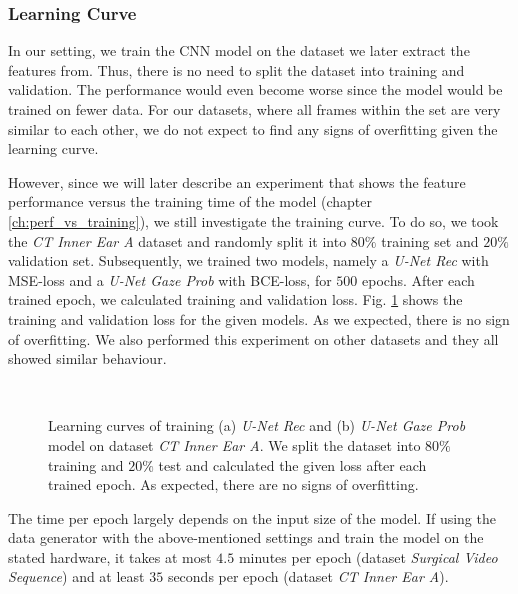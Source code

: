 \clearpage
\subsubsection{Learning Curve} \label{ch:learning_curve}
In our setting, we train the CNN model on the dataset we later extract the features from. Thus, there is no need to split the dataset into training and validation. The performance would even become worse since the model would be trained on fewer data. For our datasets, where all frames within the set are very similar to each other, we do not expect to find any signs of overfitting given the learning curve.

However, since we will later describe an experiment that shows the feature performance versus the training time of the model (chapter \ref{ch:perf_vs_training}), we still investigate the training curve. To do so, we took the \textit{CT Inner Ear A} dataset and randomly split it into $80\%$ training set and $20\%$ validation set. Subsequently, we trained two models, namely a \textit{U-Net Rec} with MSE-loss and a \textit{U-Net Gaze Prob} with BCE-loss, for $500$ epochs. After each trained epoch, we calculated training and validation loss. Fig. \ref{fig:learn_curve} shows the training and validation loss for the given models. As we expected, there is no sign of overfitting. We also performed this experiment on other datasets and they all showed similar behaviour.
\vspace{20pt}

\begin{figure}[!htbp]
  \centering
  \\
  \caption[Model learning curves]{Learning curves of training (a) \textit{U-Net Rec} and (b) \textit{U-Net Gaze Prob} model on dataset \textit{CT Inner Ear A}. We split the dataset into $80\%$ training and $20\%$ test and calculated the given loss after each trained epoch. As expected, there are no signs of overfitting.}
  \label{fig:learn_curve}  
\end{figure}
\vspace{20pt}

The time per epoch largely depends on the input size of the model. If using the data generator with the above-mentioned settings and train the model on the stated hardware, it takes at most $4.5$ minutes per epoch (dataset \textit{Surgical Video Sequence}) and at least $35$ seconds per epoch (dataset \textit{CT Inner Ear A}).

